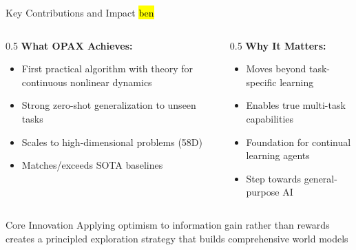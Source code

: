 \documentclass[11pt,aspectratio=169]{beamer}
\begin{document}
\begin{frame}{Key Contributions and Impact \hl{ben}}
    \begin{columns}[T]
        \begin{column}{0.5\textwidth}
            \textbf{What OPAX Achieves:}
            \begin{itemize}
                \item \alert{First} practical algorithm with theory for continuous nonlinear dynamics
                \item Strong zero-shot generalization to unseen tasks
                \item Scales to high-dimensional problems (58D)
                \item Matches/exceeds SOTA baselines
            \end{itemize}
        \end{column}
        \begin{column}{0.5\textwidth}
            \textbf{Why It Matters:}
            \begin{itemize}
                \item Moves beyond task-specific learning
                \item Enables true multi-task capabilities
                \item Foundation for continual learning agents
                \item Step towards general-purpose AI
            \end{itemize}
        \end{column}
    \end{columns}
    
    \vspace{0.5em}
    \begin{block}{Core Innovation}
        Applying \alert{optimism} to \alert{information gain} rather than rewards creates a principled exploration strategy that builds comprehensive world models
    \end{block}
\end{frame}
\end{document}

